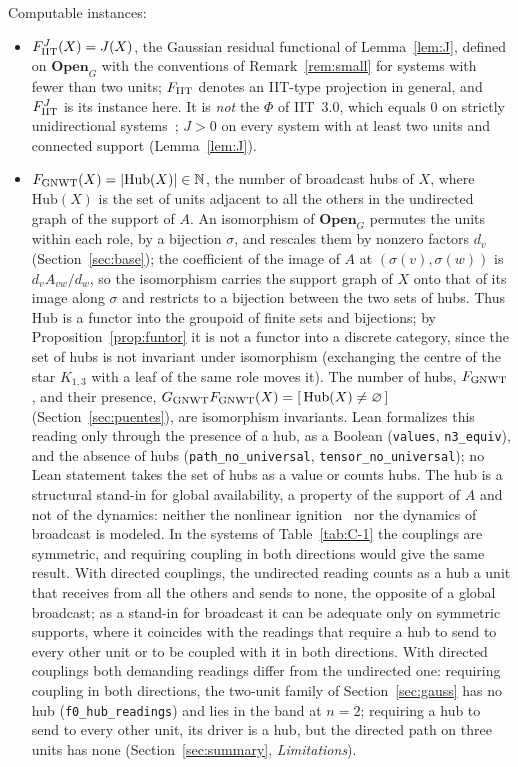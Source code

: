 Computable instances:
\begin{itemize}
\item $F_{\rm IIT}^J(X)=J(X)$, the Gaussian residual functional of Lemma~\ref{lem:J}, defined on $\mathbf{Open}_G$ with the conventions of Remark~\ref{rem:small} for systems with fewer than two units; $F_{\rm IIT}$ denotes an IIT-type projection in general, and $F_{\rm IIT}^J$ is its instance here. It is \emph{not} the $\Phi$ of IIT~3.0, which equals $0$ on strictly unidirectional systems~\cite{Oizumi2014}; $J>0$ on every system with at least two units and connected support (Lemma~\ref{lem:J}).
\item $F_{\rm GNWT}(X)=\lvert\mathrm{Hub}(X)\rvert\in\mathbb N$, the number of broadcast hubs of $X$, where $\mathrm{Hub}(X)$ is the set of units adjacent to all the others in the undirected graph of the support of $A$. An isomorphism of $\mathbf{Open}_G$ permutes the units within each role, by a bijection $\sigma$, and rescales them by nonzero factors $d_v$ (Section~\ref{sec:base}); the coefficient of the image of $A$ at $(\sigma(v),\sigma(w))$ is $d_vA_{vw}/d_w$, so the isomorphism carries the support graph of $X$ onto that of its image along $\sigma$ and restricts to a bijection between the two sets of hubs. Thus $\mathrm{Hub}$ is a functor into the groupoid of finite sets and bijections; by Proposition~\ref{prop:funtor} it is not a functor into a discrete category, since the set of hubs is not invariant under isomorphism (exchanging the centre of the star $K_{1,3}$ with a leaf of the same role moves it). The number of hubs, $F_{\rm GNWT}$, and their presence, $G_{\rm GNWT}F_{\rm GNWT}(X)=[\,\mathrm{Hub}(X)\ne\varnothing\,]$ (Section~\ref{sec:puentes}), are isomorphism invariants. Lean formalizes this reading only through the presence of a hub, as a Boolean (\texttt{values}, \texttt{n3\_equiv}), and the absence of hubs (\texttt{path\_no\_universal}, \texttt{tensor\_no\_universal}); no Lean statement takes the set of hubs as a value or counts hubs. The hub is a structural stand-in for global availability, a property of the support of $A$ and not of the dynamics: neither the nonlinear ignition~\cite{DehaeneChangeux2011} nor the dynamics of broadcast is modeled. In the systems of Table~\ref{tab:C-1} the couplings are symmetric, and requiring coupling in both directions would give the same result. With directed couplings, the undirected reading counts as a hub a unit that receives from all the others and sends to none, the opposite of a global broadcast; as a stand-in for broadcast it can be adequate only on symmetric supports, where it coincides with the readings that require a hub to send to every other unit or to be coupled with it in both directions. With directed couplings both demanding readings differ from the undirected one: requiring coupling in both directions, the two-unit family of Section~\ref{sec:gauss} has no hub (\texttt{f0\_hub\_readings}) and lies in the band at $n=2$; requiring a hub to send to every other unit, its driver is a hub, but the directed path on three units has none (Section~\ref{sec:summary}, \emph{Limitations}).

\end{itemize}
